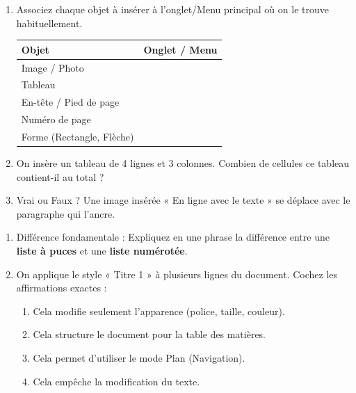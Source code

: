 \documentclass[11pt]{article}
\begin{document}
\begin{exercice}
\begin{enumerate}
    \item Associez chaque objet à insérer à l'onglet/Menu principal où on le trouve habituellement.
    \begin{tabular}{|p{4cm}|p{4cm}|}
    \hline
    \textbf{Objet} & \textbf{Onglet / Menu} \\ \hline
    Image / Photo & \\ \hline
    Tableau & \\ \hline
    En-tête / Pied de page & \\ \hline
    Numéro de page & \\ \hline
    Forme (Rectangle, Flèche) & \\ \hline
    \end{tabular}
    \item On insère un tableau de 4 lignes et 3 colonnes. Combien de cellules ce tableau contient-il au total ?
    \item Vrai ou Faux ? Une image insérée « En ligne avec le texte » se déplace avec le paragraphe qui l'ancre.
\end{enumerate}
\end{exercice}

\begin{exercice}
\begin{enumerate}
    \item Différence fondamentale : Expliquez en une phrase la différence entre une \textbf{liste à puces} et une \textbf{liste numérotée}.
    \item On applique le style « Titre 1 » à plusieurs lignes du document. Cochez les affirmations exactes :
    \begin{enumerate}
        \item Cela modifie seulement l'apparence (police, taille, couleur).
        \item Cela structure le document pour la table des matières.
        \item Cela permet d'utiliser le mode Plan (Navigation).
        \item Cela empêche la modification du texte.
    \end{enumerate}
\end{enumerate}
\end{exercice}
\end{document}
